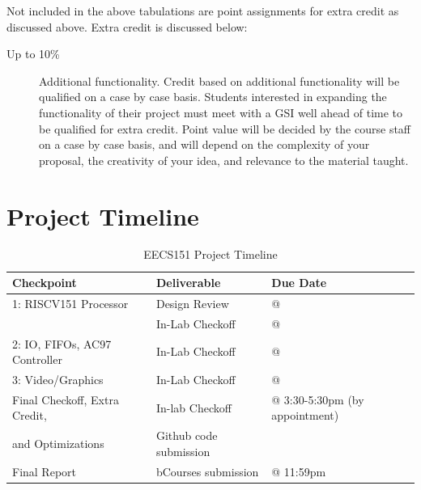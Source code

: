 \documentclass[11pt]{article}
\begin{document}
Not included in the above tabulations are point assignments for extra credit as discussed above. Extra credit is discussed below:

\begin{description}
  \item[Up to 10\%] Additional functionality. Credit based on additional functionality will be qualified on a case by case basis. Students interested in expanding the functionality of their project must meet with a GSI well ahead of time to be qualified for extra credit. Point value will be decided by the course staff on a case by case basis, and will depend on the complexity of your proposal, the creativity of your idea, and relevance to the material taught.
\end{description}

\pagebreak
\section{Project Timeline}

\begin{table}[h!]
	\centering
	\begin{center}
	\begin{tabular}{l l l}
		\toprule
		{Checkpoint} &{Deliverable} & {Due Date} \\
		\midrule
		1: RISCV151 Processor & Design Review &  \blockDiagramDueDate \space @ \dueDateTime\\
		 & In-Lab Checkoff & \baseCPUDueDate \space @ \dueDateTime \\
		\midrule
		2: IO, FIFOs, AC97 Controller & In-Lab Checkoff & \audioDueDate \space @ \dueDateTime \\
		\midrule
		3: Video/Graphics & In-Lab Checkoff &  \ethernetDueDate \space @ \dueDateTime\\
		\midrule
		Final Checkoff, Extra Credit, &    In-lab Checkoff        & \finalCheckoffDueDate \space @ 3:30-5:30pm (by appointment) \\
		and Optimizations             & Github code submission    & \\
		\midrule
		Final Report                  &   bCourses submission     & \finalCheckoffDueDate \space @ 11:59pm\\
		\bottomrule
	\end{tabular}
	\end{center}
    \caption{EECS151 \currentSemester \space Project Timeline}\label{tab:master}
\end{table}
\end{document}

